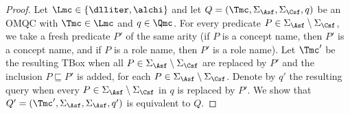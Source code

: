 \documentclass{lmcs}
\theoremstyle{definition}
\newcommand{\sigmaabox}{\Sigma_\Asf}
\newcommand{\sigmaclosed}{\Sigma_\Csf}
\begin{document}
\begin{proof}
Let $\Lmc\in \{ \dlliter, \alchi\}$
%
%
and let $Q=(\Tmc,\Sigma_\Asf,\sigmaclosed,q)$ be an OMQC with $\Tmc\in \Lmc$ and $q \in \Qmc$. %
%
  For every predicate $P\in \sigmaabox\setminus \sigmaclosed$, we take a fresh
  predicate $P'$ of the same arity (if $P$ is a concept name, then $P'$
  is a concept name, and if $P$ is a role name, then $P'$ is a role
  name). Let $\Tmc'$ be the resulting TBox when all
  $P\in\sigmaabox\setminus \sigmaclosed$ are replaced by $P'$ and the
  inclusion $P \sqsubseteq P'$ is added, for each
  $P\in \sigmaabox\setminus \sigmaclosed$.  Denote by $q'$ the
  resulting query when every $P\in \Sigma_\Asf\setminus \sigmaclosed$
  in $q$ is replaced by $P'$. We show that
  $Q'=(\Tmc',\sigmaabox,\sigmaabox,q')$ is equivalent
  to $Q$.


\end{proof}
\end{document}
